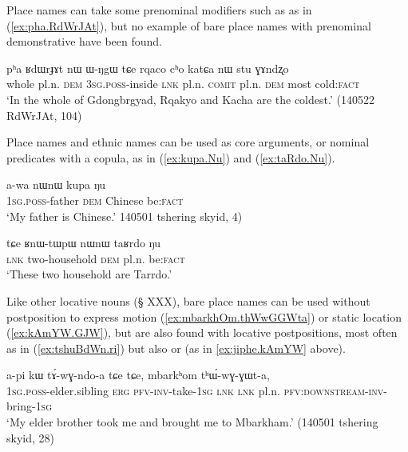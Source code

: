 Place names can take some prenominal modifiers such as  as in (\ref{ex:pha.RdWrJAt}), but no example of bare place names with prenominal demonstrative have been found. %

\begin{exe}
\ex \label{ex:pha.RdWrJAt}
 \gll pʰa ʁdɯrɟɤt nɯ ɯ-ŋgɯ tɕe rqaco cʰo katɕa nɯ stu ɣɤndʐo \\
 whole pl.n. \textsc{dem} \textsc{3sg}.\textsc{poss}-inside \textsc{lnk} pl.n. \textsc{comit} pl.n. \textsc{dem} most cold:\textsc{fact} \\
 \glt  `In the whole of Gdongbrgyad, Rqakyo and Kacha are the coldest.' (140522 RdWrJAt, 104)
\end{exe}

Place names and ethnic names can be used as core arguments, or nominal predicates with a copula, as in (\ref{ex:kupa.Nu}) and (\ref{ex:taRdo.Nu}).

\begin{exe}
\ex \label{ex:kupa.Nu}
\gll  a-wa nɯnɯ kupa ŋu \\
\textsc{1sg}.\textsc{poss}-father \textsc{dem} Chinese be:\textsc{fact}  \\
\glt `My father is Chinese.' 140501 tshering skyid, 4)
\end{exe}

\begin{exe}
\ex \label{ex:taRdo.Nu}
\gll  tɕe ʁnɯ-tɯpɯ nɯnɯ taʁrdo ŋu  \\
\textsc{lnk} two-household \textsc{dem} pl.n. be:\textsc{fact} \\
\glt `These two household are Tarrdo.' 
\end{exe}

Like other locative nouns (§ XXX), bare place names can be used without postposition to express motion (\ref{ex:mbarkhOm.thWwGGWta}) or static location (\ref{ex:kAmYW.GJW}), but are also found with locative postpositions, most often  as in (\ref{ex:tshuBdWn.ri}) but also  or  (as in \ref{ex:jiphe.kAmYW} above).

\begin{exe}
\ex \label{ex:mbarkhOm.thWwGGWta}
 \gll a-pi kɯ tɤ́-wɣ-ndo-a tɕe tɕe, mbarkʰom tʰɯ́-wɣ-ɣɯt-a, \\
 \textsc{1sg}.\textsc{poss}-elder.sibling  \textsc{erg} \textsc{pfv}-\textsc{inv}-take-\textsc{1sg} \textsc{lnk} \textsc{lnk} pl.n.   \textsc{pfv:downstream}-\textsc{inv}-bring-\textsc{1sg}  \\
\glt `My elder brother took me and brought me to Mbarkham.' (140501 tshering skyid, 28)
\end{exe}

